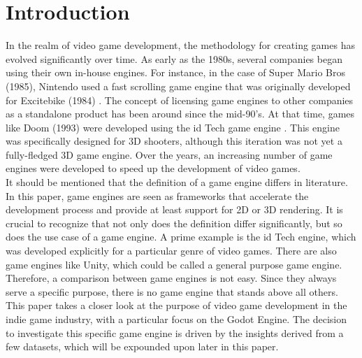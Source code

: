 \section{Introduction}
In the realm of video game development, the methodology for creating games has evolved significantly over time.
As early as the 1980s, several companies began using their own in-house engines.
For instance, in the case of Super Mario Bros (1985), Nintendo used a fast scrolling game engine that was originally developed for Excitebike (1984) \cite{history-digital-games}.
The concept of licensing game engines to other companies as a standalone product has been around since the mid-90's.
At that time, games like Doom (1993) were developed using the id Tech game engine \cite{id-tech-doom}.
This engine was specifically designed for 3D shooters, although this iteration was not yet a fully-fledged 3D game engine.
Over the years, an increasing number of game engines were developed to speed up the development of video games.\\
 
It should be mentioned that the definition of a game engine differs in literature.
In this paper, game engines are seen as frameworks that accelerate the development process and provide at least support for 2D or 3D rendering.
It is crucial to recognize that not only does the definition differ significantly, but so does the use case of a game engine.
A prime example is the id Tech engine, which was developed explicitly for a particular genre of video games.
There are also game engines like Unity, which could be called a general purpose game engine.
Therefore, a comparison between game engines is not easy.
Since they always serve a specific purpose, there is no game engine that stands above all others.
This paper takes a closer look at the purpose of video game development in the indie game industry, with a particular focus on the Godot Engine.
The decision to investigate this specific game engine is driven by the insights derived from a few datasets, which will be expounded upon later in this paper.
